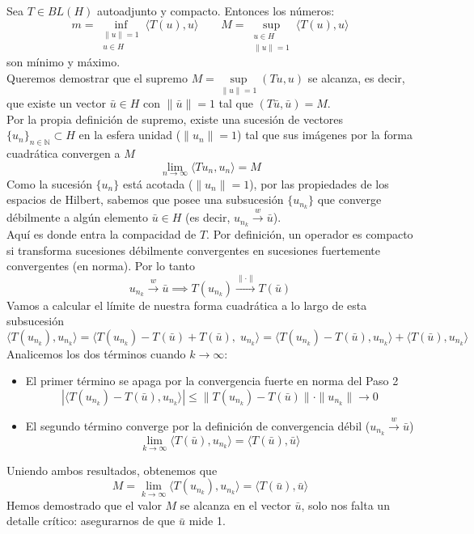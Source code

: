 \begin{ejercicio}
    Sea $T \in BL(H)$ autoadjunto y compacto. Entonces los números:
    \[ m = \inf_{\substack{\|u\|=1 \\ u \in H}} \langle T(u), u \rangle \qquad M = \sup_{\substack{u \in H \\ \|u\|=1}} \langle T(u), u \rangle \]
    son mínimo y máximo. \\

    \noindent
    Queremos demostrar que el supremo $M = \sup\limits_{\|u\|=1} ( Tu, u )$ se alcanza, es decir, que existe un vector $\bar{u} \in H$ con $\|\bar{u}\|=1$ tal que $( T\bar{u}, \bar{u} ) = M$. \\

    \noindent
    Por la propia definición de supremo, existe una sucesión de vectores $\{u_n\}_{n \in \mathbb{N}} \subset H$ en la esfera unidad ($\|u_n\| = 1$) tal que sus imágenes por la forma cuadrática convergen a $M$
    $$\lim_{n \to \infty} \langle Tu_n, u_n \rangle = M$$
    Como la sucesión $\{u_n\}$ está acotada ($\|u_n\|=1$), por las propiedades de los espacios de Hilbert, sabemos que posee una subsucesión $\{u_{n_k}\}$ que converge débilmente a algún elemento $\bar{u} \in H$ (es decir, $u_{n_k} \xrightarrow{w} \bar{u}$). \\
    
    \noindent
    Aquí es donde entra la compacidad de $T$. Por definición, un operador es compacto si transforma sucesiones débilmente convergentes en sucesiones fuertemente convergentes (en norma). Por lo tanto
    $$u_{n_k} \xrightarrow{w} \bar{u} \implies T(u_{n_k}) \xrightarrow{\|\cdot\|} T(\bar{u})$$
    Vamos a calcular el límite de nuestra forma cuadrática a lo largo de esta subsucesión
    $$\langle T(u_{n_k}), u_{n_k} \rangle = \langle T(u_{n_k}) - T(\bar{u}) + T(\bar{u}), \; u_{n_k} \rangle = \langle T(u_{n_k}) - T(\bar{u}), u_{n_k} \rangle + \langle T(\bar{u}), u_{n_k} \rangle$$
    Analicemos los dos términos cuando $k \to \infty$:
    \begin{itemize}
        \item El primer término se apaga por la convergencia fuerte en norma del Paso 2
        $$|\langle T(u_{n_k}) - T(\bar{u}), u_{n_k} \rangle| \le \|T(u_{n_k}) - T(\bar{u})\| \cdot \|u_{n_k}\| \longrightarrow 0$$
        \item El segundo término converge por la definición de convergencia débil ($u_{n_k} \xrightarrow{w} \bar{u}$)
        $$\lim_{k \to \infty} \langle T(\bar{u}), u_{n_k} \rangle = \langle T(\bar{u}), \bar{u} \rangle$$
    \end{itemize}
    Uniendo ambos resultados, obtenemos que
    $$M = \lim_{k \to \infty} \langle T(u_{n_k}), u_{n_k} \rangle = \langle T(\bar{u}), \bar{u} \rangle$$
    Hemos demostrado que el valor $M$ se alcanza en el vector $\bar{u}$, solo nos falta un detalle crítico: asegurarnos de que $\bar{u}$ mide 1. \\


\end{ejercicio}
